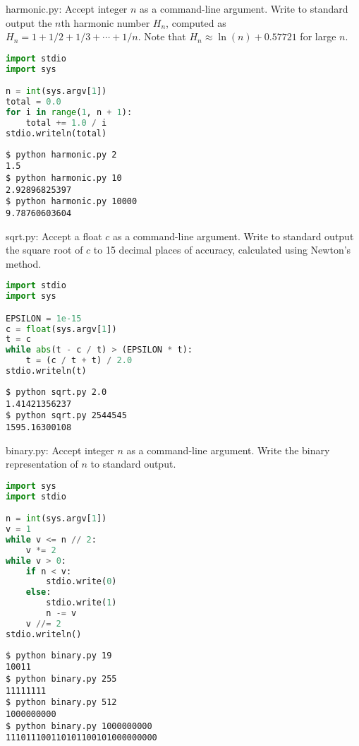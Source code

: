 \documentclass[8pt,a4paper,compress,handout]{beamer}
\begin{document}
\begin{frame}[fragile]
\begin{framed}
\tiny harmonic.py: Accept integer $n$ as a command-line argument. Write to standard output the $n$th harmonic number $H_n$, computed as $H_n=1+1/2+1/3+\cdots+1/n$. Note that $H_n \approx \ln(n) + 0.57721$ for large $n$.
\end{framed}

\begin{lstlisting}[language=Python]
import stdio
import sys

n = int(sys.argv[1])
total = 0.0
for i in range(1, n + 1):
    total += 1.0 / i
stdio.writeln(total)
\end{lstlisting}

\begin{lstlisting}[language={}]
$ python harmonic.py 2
1.5
$ python harmonic.py 10
2.92896825397
$ python harmonic.py 10000
9.78760603604
\end{lstlisting}
\end{frame}

\begin{frame}[fragile]
\begin{framed}
\tiny sqrt.py: Accept a float $c$ as a command-line argument. Write to standard output the square root of $c$ to 15 decimal places of accuracy, calculated using Newton's method.
\end{framed}

\begin{lstlisting}[language=Python]
import stdio
import sys

EPSILON = 1e-15
c = float(sys.argv[1])
t = c
while abs(t - c / t) > (EPSILON * t):
    t = (c / t + t) / 2.0
stdio.writeln(t)
\end{lstlisting}

\begin{lstlisting}[language={}]
$ python sqrt.py 2.0
1.41421356237
$ python sqrt.py 2544545
1595.16300108
\end{lstlisting}
\end{frame}

\begin{frame}[fragile]
\begin{framed}
\tiny binary.py: Accept integer $n$ as a command-line argument. Write the binary representation of $n$ to standard output.
\end{framed}

\begin{lstlisting}[language=Python]
import sys
import stdio

n = int(sys.argv[1])
v = 1
while v <= n // 2:
    v *= 2
while v > 0:
    if n < v:
        stdio.write(0)
    else:
        stdio.write(1)
        n -= v
    v //= 2
stdio.writeln()
\end{lstlisting}

\begin{lstlisting}[language={}]
$ python binary.py 19
10011
$ python binary.py 255
11111111
$ python binary.py 512
1000000000
$ python binary.py 1000000000
111011100110101100101000000000
\end{lstlisting}
\end{frame}
\end{document}
